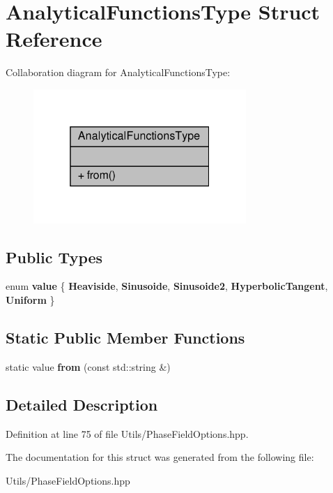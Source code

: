 \hypertarget{structAnalyticalFunctionsType}{}\section{Analytical\+Functions\+Type Struct Reference}
\label{structAnalyticalFunctionsType}


Collaboration diagram for Analytical\+Functions\+Type\+:\nopagebreak
\begin{figure}[H]
\begin{center}
\leavevmode
\includegraphics[width=229pt]{structAnalyticalFunctionsType__coll__graph}
\end{center}
\end{figure}
\subsection*{Public Types}
\begin{DoxyCompactItemize}
\item 
\mbox{\label{structAnalyticalFunctionsType_a9679669709a07a7255b7f2522af78f2c}} 
enum {\bfseries value} \{ \newline
{\bfseries Heaviside}, 
{\bfseries Sinusoide}, 
{\bfseries Sinusoide2}, 
{\bfseries Hyperbolic\+Tangent}, 
\newline
{\bfseries Uniform}
 \}
\end{DoxyCompactItemize}
\subsection*{Static Public Member Functions}
\begin{DoxyCompactItemize}
\item 
\mbox{\label{structAnalyticalFunctionsType_a2446df6460acecf21abad99e6b79c3db}} 
static value {\bfseries from} (const std\+::string \&)
\end{DoxyCompactItemize}


\subsection{Detailed Description}


Definition at line 75 of file Utils/\+Phase\+Field\+Options.\+hpp.



The documentation for this struct was generated from the following file\+:\begin{DoxyCompactItemize}
\item 
Utils/\+Phase\+Field\+Options.\+hpp\end{DoxyCompactItemize}
